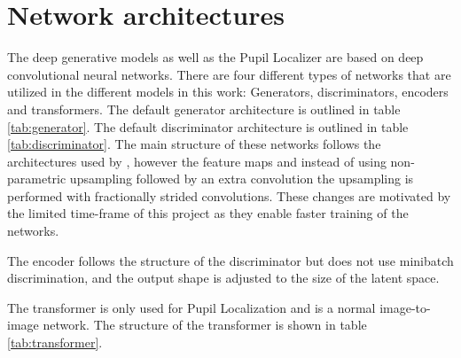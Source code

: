 \section{Network architectures}
The deep generative models as well as the Pupil Localizer are based on deep convolutional neural networks. There are four different types of networks that are utilized in the different models in this work: Generators, discriminators, encoders and transformers. The default generator architecture is outlined in table \ref{tab:generator}. The default discriminator architecture is outlined in table \ref{tab:discriminator}. The main structure of these networks follows the architectures used by \textcite{karras2017progressive}, however the feature maps and instead of using non-parametric upsampling followed by an extra convolution the upsampling is performed with fractionally strided convolutions. These changes are motivated by the limited time-frame of this project as they enable faster training of the networks.

The encoder follows the structure of the discriminator but does not use minibatch discrimination, and the output shape is adjusted to the size of the latent space. 

The transformer is only used for Pupil Localization and is a normal image-to-image network. The structure of the transformer is shown in table \ref{tab:transformer}.



